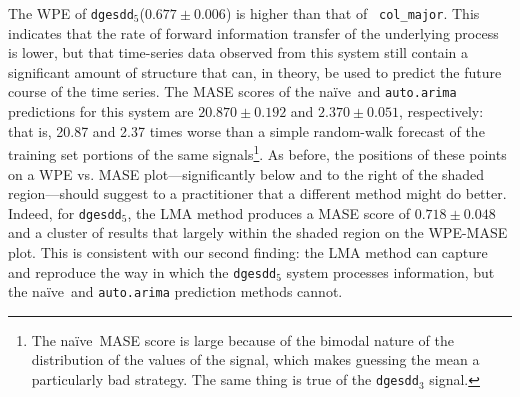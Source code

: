 \documentclass[%
pre,
reprint,
superscriptaddress,
showpacs,
nofootinbib,
nobibnotes,
 amsmath,amssymb,
 aps,
]{revtex4-1}
\newcommand{\svdthree}{{\tt dgesdd$_3$}\xspace}
\newcommand{\svdfive}{{\tt dgesdd$_5$}\xspace}
\newcommand{\arima}{{\tt auto.arima}\xspace}
\newcommand{\naive}{na\"ive}
\begin{document}
The WPE of \svdfive ($0.677 \pm 0.006$) is higher than that of {\tt
  col\_major}.  This indicates that the rate of forward information
transfer of the underlying process is lower, but that time-series data
observed from this system still contain a significant amount of
structure that can, in theory, be used to predict the future course of
the time series.
The MASE scores of the \naive ~and \arima predictions for this system
are $20.870 \pm 0.192$ and $2.370 \pm 0.051$, respectively: that is,
20.87 and 2.37 times worse than a simple random-walk forecast of the
training set portions of the same signals\footnote{The \naive ~MASE
  score is large because of the bimodal nature of the distribution of
  the values of the signal, which makes guessing the mean a
  particularly bad strategy.  The same thing is true of the \svdthree
  signal.}.  As before, the positions of these points on a WPE
vs. MASE plot---significantly below and to the right of the shaded
region---should suggest to a practitioner that
a different method might do better.  Indeed, for \svdfive, the LMA
method produces a MASE score of $ 0.718\pm 0.048 $ and a cluster of
results that largely within the shaded region on the WPE-MASE plot.
This is consistent with our second finding: the LMA method can capture
and reproduce the way in which the \svdfive system processes
information, but the \naive ~and \arima prediction methods cannot.
\end{document}
